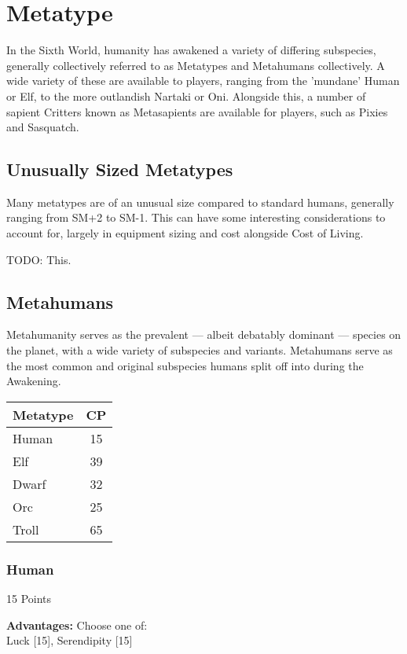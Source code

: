 \section{Metatype}

\begin{multicols*}{3}
	
	In the Sixth World, humanity has awakened a variety of differing subspecies, generally collectively referred to as Metatypes and Metahumans collectively. A wide variety of these are available to players, ranging from the 'mundane' Human or Elf, to the more outlandish Nartaki or Oni. Alongside this, a number of sapient Critters known as Metasapients are available for players, such as Pixies and Sasquatch.
	
	\subsection{Unusually Sized Metatypes}
	
	Many metatypes are of an unusual size compared to standard humans, generally ranging from SM+2 to SM-1. This can have some interesting considerations to account for, largely in equipment sizing and cost alongside Cost of Living.
	
	TODO: This.
	
	\subsection{Metahumans}
	
	Metahumanity serves as the prevalent — albeit debatably dominant — species on the planet, with a wide variety of subspecies and variants. Metahumans serve as the most common and original subspecies humans split off into during the Awakening.
	
	\begin{center}
		\begin{tabularx}{0.32\textwidth}{|X|c|}
			\hline
			Metatype & CP \\
			\hline
			\hline
			Human & 15 \\
			Elf & 39 \\
			Dwarf & 32 \\
			Orc & 25 \\
			Troll & 65 \\
			\hline
		\end{tabularx}
	\end{center}
	
	\subsubsection*{Human}
	\begin{flushright}
		15 Points
	\end{flushright}
	\textbf{Advantages:} 
	Choose one of: \\
	Luck [15], Serendipity [15]
	

\end{multicols*}
